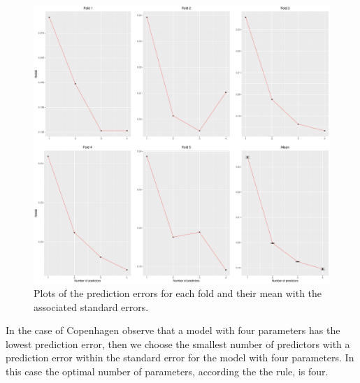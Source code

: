    \begin{figure}[H]
        \centering
      \includegraphics[width = 1 \textwidth]{figures/Nanna/CrossValidationCopenhagen.pdf}
      \caption{Plots of the prediction errors for each fold and their mean with the associated standard errors.}
      \label{fig:CrossValidationCopenhagen}
    \end{figure}
    
In the case of Copenhagen observe that a model with four parameters has the lowest prediction error, then we choose the smallest number of predictors with a prediction error within the standard error for the model with four parameters.
In this case the optimal number of parameters, according the the rule, is four.

